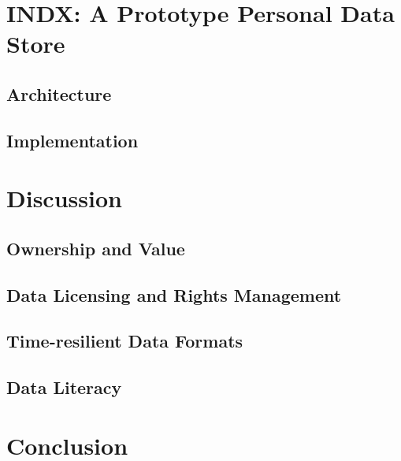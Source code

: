 \documentclass[runningheads,a4paper]{llncs}
\begin{document}
\section{INDX: A Prototype Personal Data Store}

\subsection{Architecture}

\subsection{Implementation}

\section{Discussion}

\subsection{Ownership and Value}

\subsection{Data Licensing and Rights Management}

\subsection{Time-resilient Data Formats}

\subsection{Data Literacy}

\section{Conclusion}



\end{document}

